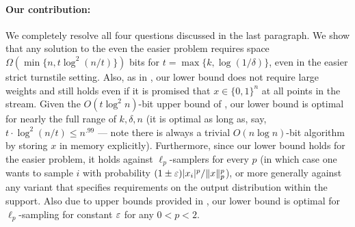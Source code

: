 \paragraph{Our contribution:} We completely resolve all four questions discussed in the last paragraph. We show that any solution to the even the easier  problem requires space $\Omega(\min\{n, t \log^2(n/t)\})$ bits for $t = \max\{k, \log(1/\delta)\}$, even in the easier strict turnstile setting. Also, as in \cite{JowhariST11}, our lower bound does not require large weights and still holds even if it is promised that $x\in\{0,1\}^n$ at all points in the stream. Given the $O(t\log^2 n)$-bit upper bound of \cite{JowhariST11}, our lower bound is optimal for nearly the full range of $k, \delta, n$ (it is optimal as long as, say, $t\cdot \log^2(n/t)\le n^{.99}$ --- note there is always a trivial $O(n \log n)$-bit algorithm by storing $x$ in memory explicitly). Furthermore, since our lower bound holds for the easier \suppfind{} problem, it holds against $\ell_p$-samplers for every $p$ (in which case one wants to sample $i$ with probability $(1\pm\varepsilon)|x_i|^p/\|x\|_p^p$), or more generally against any variant that specifies requirements on the output distribution within the support. Also due to upper bounds provided in \cite{JowhariST11}, our lower bound is optimal for $\ell_p$-sampling for constant $\varepsilon$ for any $0<p<2$. 



